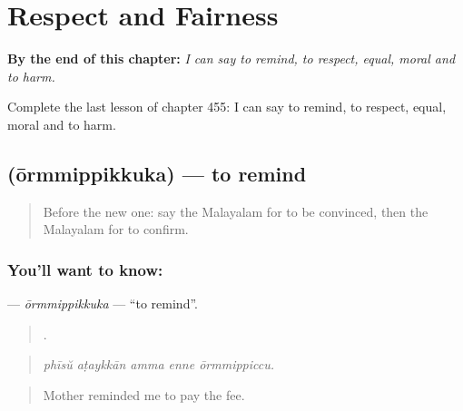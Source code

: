 
\chapter{Respect and Fairness}
\label{ch:ml-respect-and-fairness}

\begin{chapteropening}
\textbf{By the end of this chapter:} \emph{I can say to remind, to respect, equal, moral and to harm.}

Complete the last lesson of chapter 455: I can say to remind, to respect, equal, moral and to harm.
\end{chapteropening}

\section[\texorpdfstring{\ml{ഓർമ്മിപ്പിക്കുക} (ōrmmippikkuka)}{ഓർമ്മിപ്പിക്കുക (ōrmmippikkuka)}]{ (ōrmmippikkuka) — to remind}

\label{lesson:ML-C455-ormmippikkuka}



\begin{quote}
Before the new one: say the Malayalam for to be convinced, then the Malayalam for to confirm.
\end{quote}

\subsection*{You'll want to know: }
\textbf{} — \emph{ōrmmippikkuka} — \textquotedblleft{}to remind\textquotedblright{}.

\begin{quote}
    .
\end{quote}

\begin{quote}
\emph{phīsŭ aṭaykkān amma enne ōrmmippiccu.}
\end{quote}

\begin{quote}
Mother reminded me to pay the fee.
\end{quote}

